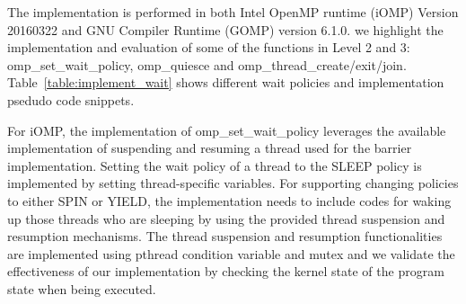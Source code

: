 The implementation is performed in both Intel OpenMP runtime (iOMP) Version 20160322 and GNU Compiler Runtime (GOMP) version 6.1.0. 
we highlight the implementation and evaluation of some of the functions in Level 2 and 3: 
{\sf omp\_set\_wait\_policy}, {\sf omp\_quiesce} and {\sf omp\_thread\_create/exit/join}. 
Table~\ref{table:implement_wait} shows different wait policies and implementation psedudo code snippets. 

For iOMP, the implementation of {\sf omp\_set\_wait\_policy} leverages the available 
implementation of suspending and resuming a thread used for the barrier implementation. Setting the 
wait policy of a thread to the {\sf SLEEP} policy is implemented by setting thread-specific variables. For
supporting changing policies to either {\sf SPIN} or {\sf YIELD}, the implementation needs to include codes for 
waking up those threads who are sleeping by using the provided thread suspension and resumption mechanisms.  
The thread suspension and resumption functionalities are implemented using pthread condition variable and mutex and 
we validate the effectiveness of our implementation by checking the kernel state of the program state when being 
executed.

\begin{table}[htbp]
	\centering
{}  
\label{table:implement_wait}
\caption{Implementation of wait policies }
\end{table}


